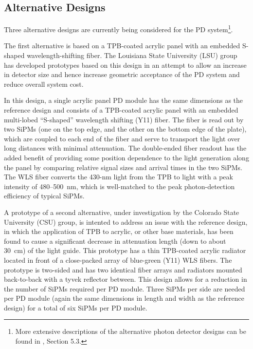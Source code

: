 \subsection{Alternative Designs} 

Three alternative designs are currently being considered for the PD
system\footnote{More extensive descriptions of the alternative photon
  detector designs can be found in \anxlbnefd, Section 5.3.}.

The first alternative is based on a TPB-coated acrylic panel with an
embedded S-shaped wavelength-shifting fiber. The Louisiana State
University (LSU) group has developed prototypes based on this design
in an attempt to allow an increase in detector size and hence increase
geometric acceptance of the PD system and reduce overall system
cost.

In this design, a single acrylic panel PD module has the same
dimensions as the reference design and consists of a TPB-coated
acrylic panel with an embedded multi-lobed ``S-shaped'' wavelength
shifting (Y11) fiber. The fiber is read out by two SiPMs (one on the
top edge, and the other on the bottom edge of the plate), which are
coupled to each end of the fiber and serve to transport the light over
long distances with minimal attenuation. The double-ended fiber
readout has the added benefit of providing some position dependence to
the light generation along the panel by comparing relative signal
sizes and arrival times in the two SiPMs. The WLS fiber converts the
430-nm light from the TPB to light with a peak intensity of
480--500~nm, which is well-matched to the peak photon-detection
efficiency of typical SiPMs.

A prototype of a second alternative, under investigation by the Colorado
State University (CSU) group, is intented to address an issue with the reference
design, in which the application of TPB to acrylic, or other base
materials, has been found to cause a significant decrease in
attenuation length (down to about 30~cm) of the light guide.
%
This prototype has a thin TPB-coated acrylic radiator located in front
of a close-packed array of blue-green (Y11) WLS fibers.  The prototype
is two-sided and has two identical fiber arrays and radiators mounted
back-to-back with a tyvek reflector between. This design allows for a
reduction in the number of SiPMs required per PD module. Three SiPMs
per side are needed per PD module (again the same dimensions in length
and width as the reference design) for a total of six SiPMs per PD
module.

